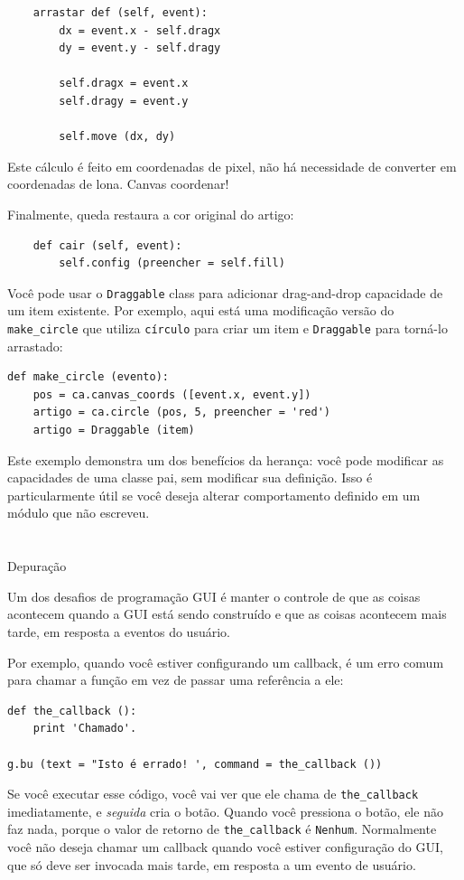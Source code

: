 \documentclass[10pt]{book}
\begin{document}
\begin{v erbatim}
\begin{verbatim}
    arrastar def (self, event):
        dx = event.x - self.dragx
        dy = event.y - self.dragy

        self.dragx = event.x
        self.dragy = event.y

        self.move (dx, dy)
\end{verbatim}
%
Este cálculo é feito em coordenadas de pixel, não há necessidade de
converter em coordenadas de lona.
{Canvas coordenar!} \Index
{}

Finalmente, {queda \tt} restaura a cor original do artigo:

\begin{verbatim}
    def cair (self, event):
        self.config (preencher = self.fill)
\end{verbatim}
%
Você pode usar o {\tt Draggable} class para adicionar drag-and-drop
capacidade de um item existente. Por exemplo, aqui está uma modificação
versão do \verb "make_circle" que utiliza {\tt círculo} para criar
um item e {\tt Draggable} para torná-lo arrastado:

\begin{verbatim}
def make_circle (evento):
    pos = ca.canvas_coords ([event.x, event.y])
    artigo = ca.circle (pos, 5, preencher = 'red')
    artigo = Draggable (item)
\end{verbatim}
%
Este exemplo demonstra um dos benefícios da herança: você pode
modificar as capacidades de uma classe pai, sem modificar sua
definição. Isso é particularmente útil se você deseja alterar
comportamento definido em um módulo que não escreveu.


\section{} Depuração

Um dos desafios de programação GUI é manter o controle de
que as coisas acontecem quando a GUI está sendo construído e que
as coisas acontecem mais tarde, em resposta a eventos do usuário.

Por exemplo, quando você estiver configurando um callback, é um erro comum
para chamar a função em vez de passar uma referência a ele:

\begin{verbatim}
def the_callback ():
    print 'Chamado'.

g.bu (text = "Isto é errado! ', command = the_callback ())
\end{verbatim}
%
Se você executar esse código, você vai ver que ele chama de \verb "the_callback"
imediatamente, e {\em seguida} cria o botão. Quando você pressiona o
botão, ele não faz nada, porque o valor de retorno de 
\Verb "the_callback" é {\tt Nenhum}.
Normalmente você não deseja chamar um callback quando você estiver
configuração do GUI, que só deve ser invocada mais tarde, em resposta a
um evento de usuário.


\end{v erbatim}
\end{document}
